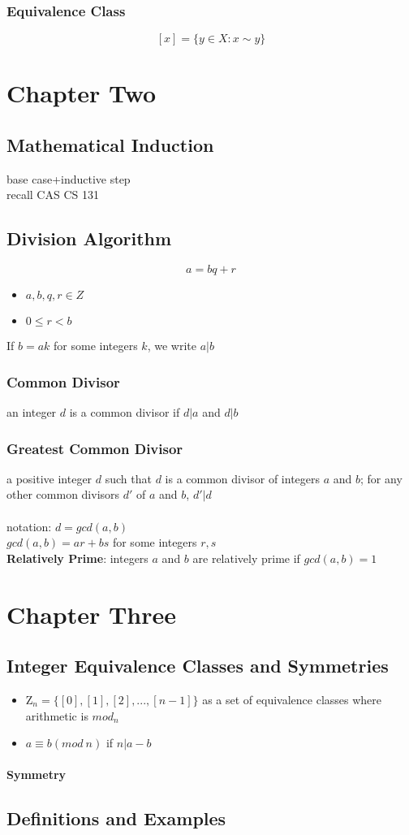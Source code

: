 \documentclass{article}
\begin{document}
\subsubsection{Equivalence Class}
$$[x]=\{y\in X: x\sim y\}$$
\section{Chapter Two}
\subsection{Mathematical Induction}
base case+inductive step\\
recall CAS CS 131
\subsection{Division Algorithm}
$$a=bq+r$$
\begin{itemize}
    \item $a,b,q,r \in Z$
    \item $0\leq r<b$
\end{itemize}
If $b=ak$ for some integers $k$, we write $a|b$
\subsubsection{Common Divisor}
an integer $d$ is a common divisor if $d|a$ and $d|b$
\subsubsection{Greatest Common Divisor}
a positive integer $d$ such that $d$ is a common divisor of integers $a$ and $b$; for any other common divisors $d'$ of $a$ and $b$, $d'|d$\\\\
notation: $d=gcd(a,b)$\\
$gcd(a,b)=ar+bs$ for some integers $r,s$\\

\textbf{Relatively Prime}: integers $a$ and $b$ are relatively prime if $gcd(a,b)=1$\\

\section{Chapter Three}
\subsection{Integer Equivalence Classes and Symmetries}
\begin{itemize}
    \item $\mathrm{Z}_n=\{[0],[1],[2],...,[n-1]\}$ as a set of equivalence classes where arithmetic is $mod_n$
    \item $a\equiv b(mod \: n)$ if $n|a-b$
\end{itemize}
\paragraph{Symmetry}
\subsection{Definitions and Examples}
\end{document}

